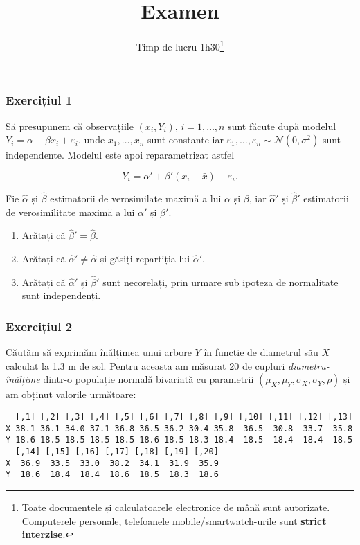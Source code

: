 \documentclass[]{article}
\title{Examen}
\subtitle{Timp de lucru 1h30\footnote{Toate documentele și calculatoarele
  electronice de mână sunt autorizate. Computerele personale,
  telefoanele mobile/smartwatch-urile sunt \textbf{strict interzise}.}}
\author{}
\date{}
\begin{document}
\maketitle

\thispagestyle{fancy}

\subsubsection{Exercițiul 1}\label{exercitiul-1}

Să presupunem că observațiile \((x_i,Y_i)\), \(i=1,\ldots,n\) sunt
făcute după modelul \(Y_i = \alpha + \beta x_i + \varepsilon_i\), unde
\(x_1,\ldots,x_n\) sunt constante iar
\(\varepsilon_1,\ldots,\varepsilon_n\sim \mathcal{N}(0,\sigma^2)\) sunt
independente. Modelul este apoi reparametrizat astfel

\[
Y_i = \alpha' + \beta' (x_i-\bar{x}) + \varepsilon_i.
\]

Fie \(\hat{\alpha}\) și \(\hat{\beta}\) estimatorii de verosimilate
maximă a lui \(\alpha\) și \(\beta\), iar \(\hat{\alpha}'\) și
\(\hat{\beta}'\) estimatorii de verosimilitate maximă a lui \(\alpha'\)
și \(\beta'\).

\begin{enumerate}
\def\labelenumi{\alph{enumi})}
\item
  Arătați că \(\hat{\beta}' = \hat{\beta}\).
\item
  Arătați că \(\hat{\alpha}' \neq \hat{\alpha}\) și găsiți repartiția
  lui \(\hat{\alpha}'\).
\item
  Arătați că \(\hat{\alpha}'\) și \(\hat{\beta}'\) sunt necorelați, prin
  urmare sub ipoteza de normalitate sunt independenți.
\end{enumerate}

\subsubsection{Exercițiul 2}\label{exercitiul-2}

Căutăm să exprimăm înălțimea unui arbore \(Y\) în funcție de diametrul
său \(X\) calculat la 1.3 m de sol. Pentru aceasta am măsurat 20 de
cupluri \emph{diametru-înălțime} dintr-o populație normală bivariată cu
parametrii \((\mu_X, \mu_Y, \sigma_X, \sigma_Y, \rho)\) și am obținut
valorile următoare:

\begin{verbatim}
  [,1] [,2] [,3] [,4] [,5] [,6] [,7] [,8] [,9] [,10] [,11] [,12] [,13]
X 38.1 36.1 34.0 37.1 36.8 36.5 36.2 30.4 35.8  36.5  30.8  33.7  35.8
Y 18.6 18.5 18.5 18.5 18.5 18.6 18.5 18.3 18.4  18.5  18.4  18.4  18.5
  [,14] [,15] [,16] [,17] [,18] [,19] [,20]
X  36.9  33.5  33.0  38.2  34.1  31.9  35.9
Y  18.6  18.4  18.4  18.6  18.5  18.3  18.6
\end{verbatim}
\end{document}
